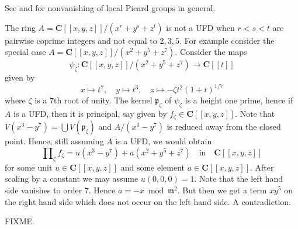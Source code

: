 \begin{example}
\label{example-completion-not-factorial}
\begin{reference}
See \cite{Brieskorn} and \cite{Lipman-rational} for nonvanishing of
local Picard groups in general.
\end{reference}
The ring $A = \mathbf{C}[[x, y, z]]/(x^r + y^s + z^t)$
is not a UFD when $r < s < t$ are pairwise coprime integers
and not equal to $2, 3, 5$. For example consider the special
case $A = \mathbf{C}[[x, y, z]]/(x^2 + y^5 + z^7)$.
Consider the maps
$$
\psi_\zeta : \mathbf{C}[[x, y, z]]/(x^2 + y^5 + z^7) \to \mathbf{C}[[t]]
$$
given by
$$
x \mapsto t^7,\quad
y \mapsto t^3,\quad
z \mapsto -\zeta t^2(1 + t)^{1/7}
$$
where $\zeta$ is a $7$th root of unity. The kernel $\mathfrak p_\zeta$
of $\psi_\zeta$ is a height one prime, hence if $A$ is a UFD, then
it is principal, say given by $f_\zeta \in \mathbf{C}[[x, y, z]]$.
Note that $V(x^3 - y^7) = \bigcup V(\mathfrak p_\zeta)$
and $A/(x^3 - y^7)$ is reduced away from the closed point. Hence,
still assuming $A$ is a UFD, we would obtain
$$
\prod\nolimits_\zeta f_\zeta = u(x^3 - y^7) + a(x^2 + y^5 + z^7)
\quad\text{in}\quad
\mathbf{C}[[x, y, z]]
$$
for some unit $u \in \mathbf{C}[[x, y, z]]$ and some
element $a \in \mathbf{C}[[x, y, z]]$. After scaling by a constant
we may assume $u(0, 0, 0) = 1$. Note that the left hand side vanishes to
order $7$. Hence $a = - x \bmod \mathfrak m^2$. But then we get a term
$xy^5$ on the right hand side which does not occur on the left
hand side. A contradiction.
\end{example}

\begin{example}
\label{example-not-blow-up}
FIXME.
\end{example}














